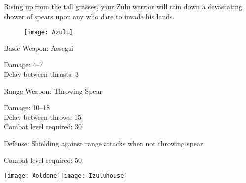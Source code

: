 
Rising up from the tall grasses, your Zulu warrior will rain down a devastating shower of spears upon any who dare to invade his lands.
	
\begin{wrapfigure}{r}{0.5\textwidth}
	\begin{center}
		\vspace{-20pt}
		\texttt{[image: Azulu]}
	\end{center}
	\vspace{-20pt}
\end{wrapfigure}

Basic Weapon: Assegai
\begin{adjustwidth}{1cm}{}
	Damage: 4–7 \\
	Delay between thrusts: 3
\end{adjustwidth}
Range Weapon: Throwing Spear
\begin{adjustwidth}{1cm}{}
	Damage: 10–18 \\
	Delay between throws: 15 \\
	Combat level required: 30
\end{adjustwidth}
Defense: Shielding against range attacks when not throwing spear
\begin{adjustwidth}{1cm}{}
	Combat level required: 50
\end{adjustwidth}

\begin{center}
	\texttt{[image: Aoldone]}\texttt{[image: Izuluhouse]}
\end{center}